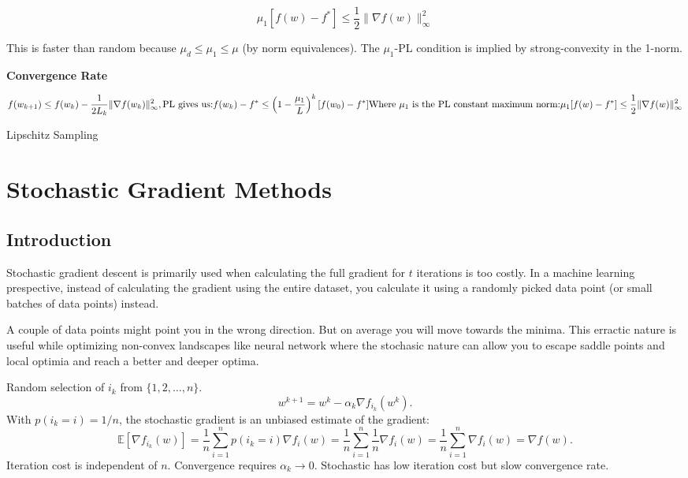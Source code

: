 \documentclass[
]{article}
\begin{document}
\[
\mu_1 [f(w) - f^*] \leq \frac{1}{2} \|\nabla f(w)\|^2_\infty
\]

This is faster than random because \(\mu_d \leq \mu_1 \leq \mu\) (by norm equivalences). The \(\mu_1\)-PL condition is implied by strong-convexity in the 1-norm.

\textbf{Convergence Rate}

\[
f(w_{k+1}) \leq f(w_k) - \frac{1}{2L_k} \|\nabla f(w_k)\|_\infty^2,\\
\text{PL gives us:}\\
f(w_k) - f^* \leq \left( 1 - \frac{\mu_1}{L} \right)^k [f(w_0) - f^*] \\
\text{Where } \mu_1 \text{ is the PL constant maximum norm:}\\
\mu_1[f(w) - f^*] \leq \frac{1}{2} \| \nabla f(w) \|_\infty^2
\]

Lipschitz Sampling

\section{Stochastic Gradient Methods}\label{stochastic-gradient-methods}

\subsection{Introduction}\label{introduction}

Stochastic gradient descent is primarily used when calculating the full gradient for \(t\) iterations is too costly. In a machine learning prespective, instead of calculating the gradient using the entire dataset, you calculate it using a randomly picked data point (or small batches of data points) instead.

A couple of data points might point you in the wrong direction. But on average you will move towards the minima. This erractic nature is useful while optimizing non-convex landscapes like neural network where the stochasic nature can allow you to escape saddle points and local optimia and reach a better and deeper optima.

Random selection of \(i_k\) from \(\{1, 2, \ldots, n\}\).
\[ 
w^{k+1} = w^k - \alpha_k \nabla f_{i_k}(w^k). 
\]
With \(p(i_k = i) = 1/n\), the stochastic gradient is an unbiased estimate of the gradient:
\[ 
\mathbb{E}[\nabla f_{i_k}(w)] = \frac{1}{n} \sum_{i=1}^{n} p(i_k = i) \nabla f_i(w) = \frac{1}{n} \sum_{i=1}^{n} \frac{1}{n} \nabla f_i(w) = \frac{1}{n} \sum_{i=1}^{n} \nabla f_i(w) = \nabla f(w). 
\]
Iteration cost is independent of \(n\). Convergence requires \(\alpha_k \to 0\). Stochastic has low iteration cost but slow convergence rate.
\end{document}
